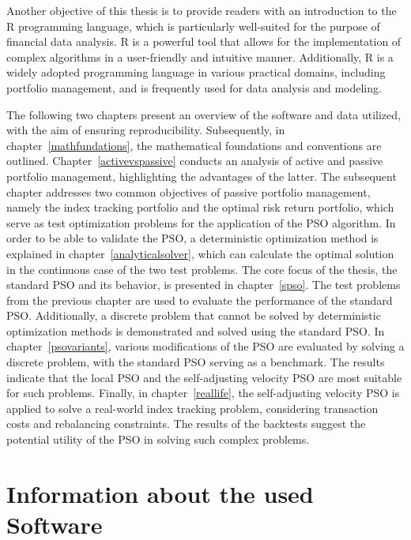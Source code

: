 \documentclass[
  oneside, a4paper, 12pt, openany]{book}
\theoremstyle{definition}
\theoremstyle{definition}
\theoremstyle{definition}
\theoremstyle{definition}
\theoremstyle{remark}
\begin{document}
Another objective of this thesis is to provide readers with an introduction to the R programming language, which is particularly well-suited for the purpose of financial data analysis. R is a powerful tool that allows for the implementation of complex algorithms in a user-friendly and intuitive manner. Additionally, R is a widely adopted programming language in various practical domains, including portfolio management, and is frequently used for data analysis and modeling.

The following two chapters present an overview of the software and data utilized, with the aim of ensuring reproducibility. Subsequently, in chapter~\ref{mathfundations}, the mathematical foundations and conventions are outlined. Chapter~\ref{activevspassive} conducts an analysis of active and passive portfolio management, highlighting the advantages of the latter. The subsequent chapter addresses two common objectives of passive portfolio management, namely the index tracking portfolio and the optimal risk return portfolio, which serve as test optimization problems for the application of the PSO algorithm. In order to be able to validate the PSO, a deterministic optimization method is explained in chapter~\ref{analyticalsolver}, which can calculate the optimal solution in the continuous case of the two test problems. The core focus of the thesis, the standard PSO and its behavior, is presented in chapter~\ref{spso}. The test problems from the previous chapter are used to evaluate the performance of the standard PSO. Additionally, a discrete problem that cannot be solved by deterministic optimization methods is demonstrated and solved using the standard PSO. In chapter~\ref{psovariants}, various modifications of the PSO are evaluated by solving a discrete problem, with the standard PSO serving as a benchmark. The results indicate that the local PSO and the self-adjusting velocity PSO are most suitable for such problems. Finally, in chapter~\ref{reallife}, the self-adjusting velocity PSO is applied to solve a real-world index tracking problem, considering transaction costs and rebalancing constraints. The results of the backtests suggest the potential utility of the PSO in solving such complex problems.

\hypertarget{information-about-the-used-software}{%
\chapter{Information about the used Software}\label{information-about-the-used-software}}
\end{document}
